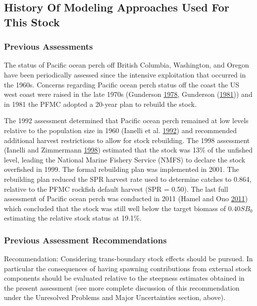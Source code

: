 \documentclass[12pt,]{article}
\begin{document}
\subsection{History Of Modeling Approaches Used For This
Stock}\label{history-of-modeling-approaches-used-for-this-stock}

\subsubsection{Previous Assessments}\label{previous-assessments}

The status of Pacific ocean perch off British Columbia, Washington, and
Oregon have been periodically assessed since the intensive exploitation
that occurred in the 1960s. Concerns regarding Pacific ocean perch
status off the coast the US west coast were raised in the late 1970s
(Gunderson \protect\hyperlink{ref-gunderson_results_1978}{1978},
Gunderson (\protect\hyperlink{ref-gunderson_updated_1981}{1981})) and in
1981 the PFMC adopted a 20-year plan to rebuild the stock.

The 1992 assessment determined that Pacific ocean perch remained at low
levels relative to the population size in 1960 (Ianelli et al.
\protect\hyperlink{ref-ianelli_status_1992}{1992}) and recommended
additional harvest restrictions to allow for stock rebuilding. The 1998
assessment (Ianelli and Zimmermann
\protect\hyperlink{ref-ianelli_status_1998}{1998}) estimated that the
stock was 13\% of the unfished level, leading the National Marine
Fishery Service (NMFS) to declare the stock overfished in 1999. The
formal rebuilding plan was implemented in 2001. The rebuilding plan
reduced the SPR harvest rate used to determine catches to 0.864,
relative to the PFMC rockfish default harvest (SPR = 0.50). The last
full assessment of Pacific ocean perch was conducted in 2011 (Hamel and
Ono \protect\hyperlink{ref-hamel_stock_2011}{2011}) which concluded that
the stock was still well below the target biomass of \(0.40SB_{0}\)
estimating the relative stock status at 19.1\%.

\subsubsection{Previous Assessment
Recommendations}\label{previous-assessment-recommendations}

Recommendation: Considering trans-boundary stock effects should be
pursued. In particular the consequences of having spawning contributions
from external stock components should be evaluated relative to the
steepness estimates obtained in the present assessment (see more
complete discussion of this recommendation under the Unresolved Problems
and Major Uncertainties section, above).
\end{document}
